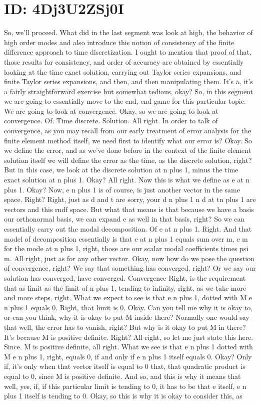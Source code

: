 \documentclass[10pt]{article}
\begin{document}
\section*{ID: 4Dj3U2ZSj0I}
So, we'll proceed. What did in the last segment was look at high, the behavior of high order modes and also introduce this notion of consistency of the finite difference approach to time discretization. I ought to mention that proof of that, those results for consistency, and order of accuracy are obtained by essentially looking at the time exact solution, carrying out Taylor series expansions, and finite Taylor series expansions, and then, and then manipulating them. It's a, it's a fairly straightforward exercise but somewhat tedious, okay? So, in this segment we are going to essentially move to the end, end game for this particular topic. We are going to look at convergence. Okay, so we are going to look at convergence. Of. Time discrete. Solution. All right. In order to talk of convergence, as you may recall from our early treatment of error analysis for the finite element method itself, we need first to identify what our error is? Okay. So we define the error, and as we've done before in the context of the finite element solution itself we will define the error as the time, as the discrete solution, right? But in this case, we look at the discrete solution at n plus 1, minus the time exact solution at n plus 1. Okay? All right. Now this is what we define as e at n plus 1. Okay? Now, e n plus 1 is of course, is just another vector in the same space. Right? Right, just as d and t are sorry, your d n plus 1 n d at tn plus 1 are vectors and this rndf space. But what that means is that because we have a basis our orthonormal basis, we can expand e as well in that basis, right? So we can essentially carry out the modal decomposition. Of e at n plus 1. Right. And that model of decomposition essentially is that e at n plus 1 equals sum over m, e m for the mode at n plus 1, right, those are our scalar modal coefficients times psi m. All right, just as for any other vector. Okay, now how do we pose the question of convergence, right? We say that something has converged, right? Or we say our solution has converged, have converged. Convergence Right, is the requirement that as limit as the limit of n plus 1, tending to infinity, right, as we take more and more steps, right. What we expect to see is that e n plus 1, dotted with M e n plus 1 equals 0. Right, that limit is 0. Okay. Can you tell me why it is okay to, or can you think, why it is okay to put M inside there? Normally one would say that well, the error has to vanish, right? But why is it okay to put M in there? It's because M is positive definite. Right? All right, so let me just state this here. Since. M is positive definite, all right. What we see is that e n plus 1 dotted with M e n plus 1, right, equals 0, if and only if e n plus 1 itself equals 0. Okay? Only if, it's only when that vector itself is equal to 0 that, that quadratic product is equal to 0, since M is positive definite. And so, and this is why it means that well, yes, if, if this particular limit is tending to 0, it has to be that e itself, e n plus 1 itself is tending to 0. Okay, so this is why it is okay to consider this, as 
\end{document}
